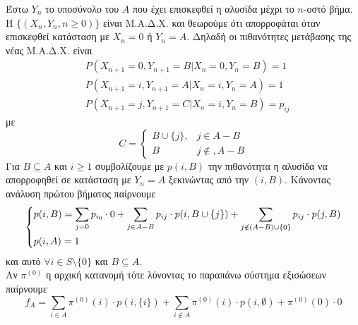 \documentclass[a4paper,11pt]{article}
\begin{document}
Έστω $Y_n$ το υποσύνολο του $A$ που έχει επισκεφθεί η αλυσίδα μέχρι το $n$-οστό βήμα.
Η $\{(X_n,Y_n,n\geq 0)\}$ είναι Μ.Α.Δ.Χ. και θεωρούμε ότι απορροφάται όταν επισκεφθεί κατάσταση με $X_n=0$ ή $Y_n=A$.
Δηλαδή οι πιθανότητες μετάβασης της νέας Μ.Α.Δ.Χ. είναι
\begin{align*}
	&P(X_{n+1}=0,Y_{n+1}=B|X_n=0,Y_n=B) = 1\\
	&P(X_{n+1}=i,Y_{n+1}=A|X_n=i,Y_n=A) = 1\\
	&P(X_{n+1}=j,Y_{n+1}=C|X_n=i,Y_n=B) = p_{ij}
\end{align*}
με
\[C = \begin{cases}
	B \cup \{j\}, & j \in A-B\\
	B & j \notin, A-B
\end{cases}\]
Για $B \subseteq A$ και $i \geq 1$ συμβολίζουμε με $p(i,B)$ την πιθανότητα η αλυσίδα να απορροφηθεί σε κατάσταση με $Y_n=A$ ξεκινώντας από την $(i,B)$.
Κάνοντας ανάλυση πρώτου βήματος παίρνουμε
\[
	\begin{dcases}
		p(i,B) = \sum_{j=0} p_{i_0} \cdot 0 + \sum_{j\in A-B} p_{ij} \cdot p(i,B\cup \{j\}) + \sum_{j\notin (A-B) \cup \{0\}} p_{ij} \cdot p(j,B)\\
		p(i,A) = 1
	\end{dcases}
\]
και αυτό $\forall i\in S \setminus \{0\}$ και $B \subseteq A$.
\\[8pt]
Αν $\pi^{(0)}$ η αρχική κατανομή τότε λύνοντας το παραπάνω σύστημα εξισώσεων παίρνουμε
\[
	f_A = \sum_{i\in A} \pi^{(0)}(i) \cdot p(i,\{i\}) + \sum_{i\notin A} \pi^{(0)}(i) \cdot p(i,\emptyset) + \pi^{(0)}(0) \cdot 0
\]
\end{document}
